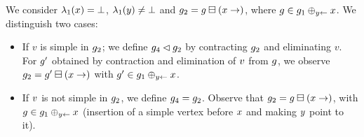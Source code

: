 \begin{enumerate}
\begin{enumerate}
We consider 
    $\lambda_1(x)=\bot$,%
    $\lambda_1(y)\neq\bot$ and %
    $g_2=g\boxminus({x}\rightarrow)$, where %
    $g\in g_1\oplus_{{y}\leftarrow}{x}$.
    We distinguish two cases:
    \begin{itemize}
    \item If $v$ is simple in $g_2$; 
      we define $g_4\lhd g_2$ by contracting $g_2$ and eliminating
      $v$. For $g'$ obtained
      by contraction and elimination of $v$ 
      from $g$, we observe 
      $g_2=g'\boxminus({x}\rightarrow)$ with 
      $g'\in g_1\oplus_{{y}\leftarrow}{x}$.
    \item If $v$ is not simple in $g_2$, 
      we define $g_4=g_2$.
      Observe that
      $g_2=g\boxminus({x}\rightarrow)$, with %
      $g\in g_1\oplus_{{y}\leftarrow}{x}$
      (insertion of a simple vertex before $x$ and making $y$ point to it).
    \end{itemize}
\end{enumerate}
%
\end{enumerate}




